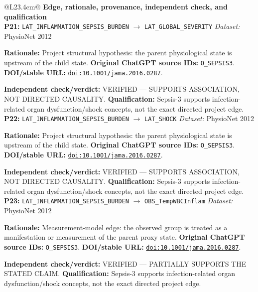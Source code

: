 \begin{tabular}{@{}L{23.4cm}@{}}
\toprule
\textbf{Edge, rationale, provenance, independent check, and qualification}\\
\midrule
\textbf{P21:} \nolinkurl{LAT_INFLAMMATION_SEPSIS_BURDEN} $\rightarrow$ \nolinkurl{LAT_GLOBAL_SEVERITY} \hfill \textit{Dataset:} PhysioNet 2012\par\textbf{Rationale:} Project structural hypothesis: the parent physiological state is upstream of the child state. \textbf{Original ChatGPT source IDs:} \nolinkurl{O_SEPSIS3}. \textbf{DOI/stable URL:} \href{https://doi.org/10.1001/jama.2016.0287}{\nolinkurl{doi:10.1001/jama.2016.0287}}.\par\textbf{Independent check/verdict:} VERIFIED --- SUPPORTS ASSOCIATION, NOT DIRECTED CAUSALITY. \textbf{Qualification:} Sepsis-3 supports infection-related organ dysfunction/shock concepts, not the exact directed project edge. \\
\addlinespace[2pt]
\midrule
\textbf{P22:} \nolinkurl{LAT_INFLAMMATION_SEPSIS_BURDEN} $\rightarrow$ \nolinkurl{LAT_SHOCK} \hfill \textit{Dataset:} PhysioNet 2012\par\textbf{Rationale:} Project structural hypothesis: the parent physiological state is upstream of the child state. \textbf{Original ChatGPT source IDs:} \nolinkurl{O_SEPSIS3}. \textbf{DOI/stable URL:} \href{https://doi.org/10.1001/jama.2016.0287}{\nolinkurl{doi:10.1001/jama.2016.0287}}.\par\textbf{Independent check/verdict:} VERIFIED --- SUPPORTS ASSOCIATION, NOT DIRECTED CAUSALITY. \textbf{Qualification:} Sepsis-3 supports infection-related organ dysfunction/shock concepts, not the exact directed project edge. \\
\addlinespace[2pt]
\midrule
\textbf{P23:} \nolinkurl{LAT_INFLAMMATION_SEPSIS_BURDEN} $\rightarrow$ \nolinkurl{OBS_TempWBCInflam} \hfill \textit{Dataset:} PhysioNet 2012\par\textbf{Rationale:} Measurement-model edge: the observed group is treated as a manifestation or measurement of the parent proxy state. \textbf{Original ChatGPT source IDs:} \nolinkurl{O_SEPSIS3}. \textbf{DOI/stable URL:} \href{https://doi.org/10.1001/jama.2016.0287}{\nolinkurl{doi:10.1001/jama.2016.0287}}.\par\textbf{Independent check/verdict:} VERIFIED --- PARTIALLY SUPPORTS THE STATED CLAIM. \textbf{Qualification:} Sepsis-3 supports infection-related organ dysfunction/shock concepts, not the exact directed project edge. \\

\end{tabular}
